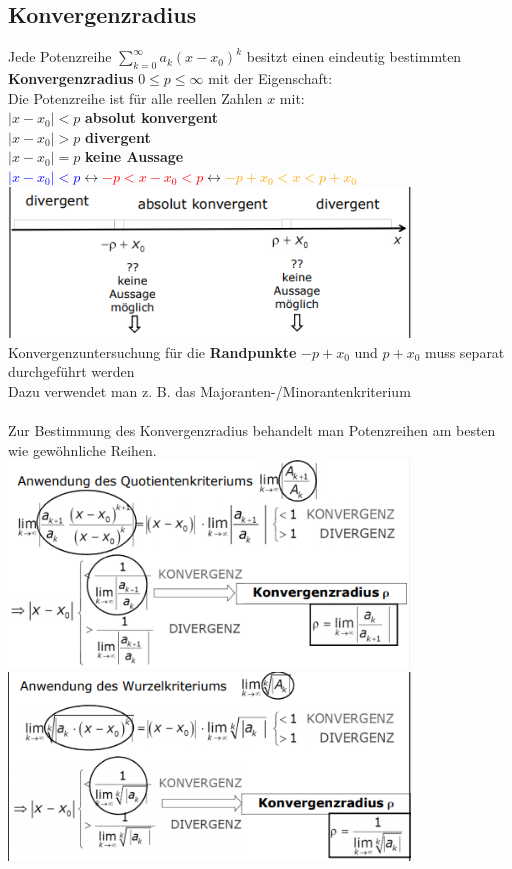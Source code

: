 \documentclass[12pt,a4paper]{article}
\begin{document}
\subsection{Konvergenzradius}
Jede Potenzreihe $\sum\limits_{k=0}^{\infty}a_k(x-x_0)^k$ besitzt einen eindeutig bestimmten 
\\\textbf{Konvergenzradius} $0\leq p\leq \infty$ mit der Eigenschaft:\\
Die Potenzreihe ist für alle reellen Zahlen $x$ mit:\\
$|x-x_0|<p$ \textbf{absolut konvergent}\\
$|x-x_0|>p$ \textbf{divergent}\\
$|x-x_0|=p$ \textbf{keine Aussage}\\
\textcolor{blue}{$|x-x_0|<p$}$\leftrightarrow$\textcolor{red}{$ -p<x-x_0<p$}$\leftrightarrow$\textcolor{orange}{$ -p+x_0<x<p+x_0$}\\
\includegraphics[width=0.8\textwidth]{Bilder/Zusfa/2.png}\\
Konvergenzuntersuchung für die \textbf{Randpunkte} $-p+x_0$ und $p+x_0$ muss separat durchgeführt werden\\
Dazu verwendet man z. B. das Majoranten-/Minorantenkriterium\\
\\
Zur Bestimmung des Konvergenzradius behandelt man Potenzreihen am besten wie gewöhnliche Reihen.\\
\includegraphics[width=0.8\textwidth]{Bilder/Zusfa/3.png}\\
\includegraphics[width=0.8\textwidth]{Bilder/Zusfa/4.png}\\
\end{document}
